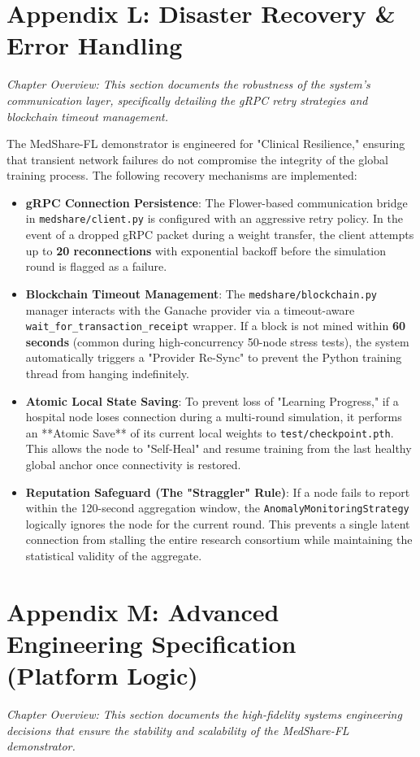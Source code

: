 \documentclass[10pt, a4paper, twocolumn]{article}
\begin{document}
\section*{Appendix L: Disaster Recovery \& Error Handling}
\textit{Chapter Overview: This section documents the robustness of the system's communication layer, specifically detailing the gRPC retry strategies and blockchain timeout management.}

The MedShare-FL demonstrator is engineered for "Clinical Resilience," ensuring that transient network failures do not compromise the integrity of the global training process. The following recovery mechanisms are implemented:

\begin{itemize}[leftmargin=1.5em]
    \item \textbf{gRPC Connection Persistence}: The Flower-based communication bridge in \texttt{medshare/client.py} is configured with an aggressive retry policy. In the event of a dropped gRPC packet during a weight transfer, the client attempts up to \textbf{20 reconnections} with exponential backoff before the simulation round is flagged as a failure.
    \item \textbf{Blockchain Timeout Management}: The \texttt{medshare/blockchain.py} manager interacts with the Ganache provider via a timeout-aware \texttt{wait\_for\_transaction\_receipt} wrapper. If a block is not mined within \textbf{60 seconds} (common during high-concurrency 50-node stress tests), the system automatically triggers a "Provider Re-Sync" to prevent the Python training thread from hanging indefinitely.
    \item \textbf{Atomic Local State Saving}: To prevent loss of "Learning Progress," if a hospital node loses connection during a multi-round simulation, it performs an **Atomic Save** of its current local weights to \texttt{test/checkpoint.pth}. This allows the node to "Self-Heal" and resume training from the last healthy global anchor once connectivity is restored.
    \item \textbf{Reputation Safeguard (The "Straggler" Rule)}: If a node fails to report within the 120-second aggregation window, the \texttt{AnomalyMonitoringStrategy} logically ignores the node for the current round. This prevents a single latent connection from stalling the entire research consortium while maintaining the statistical validity of the aggregate.
\end{itemize}

\section*{Appendix M: Advanced Engineering Specification (Platform Logic)}
\textit{Chapter Overview: This section documents the high-fidelity systems engineering decisions that ensure the stability and scalability of the MedShare-FL demonstrator.}
\end{document}
